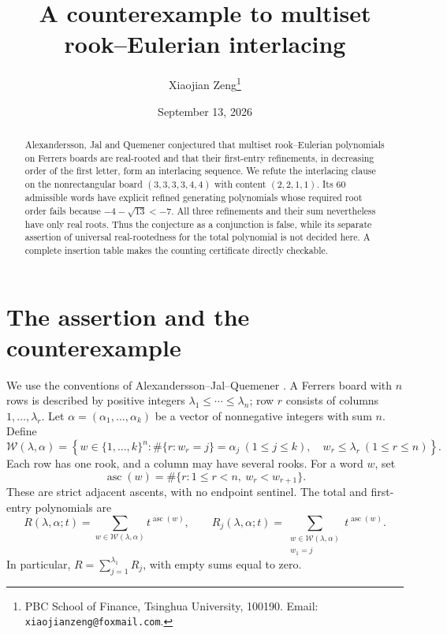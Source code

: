 \documentclass[11pt]{article}
\title{A counterexample to multiset rook--Eulerian interlacing}
\author{Xiaojian Zeng\thanks{PBC School of Finance, Tsinghua University,
100190. Email: \texttt{xiaojianzeng@foxmail.com}.}}
\date{September 13, 2026}
\DeclareMathOperator{\asc}{asc}
\newcommand{\W}{\mathcal W}
\begin{document}
\maketitle

\begin{abstract}
Alexandersson, Jal and Quemener conjectured that multiset rook--Eulerian
polynomials on Ferrers boards are real-rooted and that their first-entry
refinements, in decreasing order of the first letter, form an interlacing
sequence. We refute the interlacing clause on the nonrectangular board
$(3,3,3,3,4,4)$ with content $(2,2,1,1)$. Its $60$ admissible words have
explicit refined generating polynomials whose required root order fails
because $-4-\sqrt{13}<-7$. All three refinements and their sum nevertheless
have only real roots. Thus the conjecture as a conjunction is false, while
its separate assertion of universal real-rootedness for the total polynomial
is not decided here. A complete insertion table makes the counting
certificate directly checkable.
\end{abstract}

\section{The assertion and the counterexample}

We use the conventions of Alexandersson--Jal--Quemener
\cite[Definitions 5, 8 and 9; Section 3.3]{AJQ2025}.
A Ferrers board with $n$ rows is described by positive integers
$\lambda_1\leq\cdots\leq\lambda_n$; row $r$ consists of columns
$1,\ldots,\lambda_r$. Let $\alpha=(\alpha_1,\ldots,\alpha_k)$ be a
vector of nonnegative integers with sum $n$. Define
\[
 \W(\lambda,\alpha)=\left\{
 w\in\{1,\ldots,k\}^n:
 \#\{r:w_r=j\}=\alpha_j\ (1\leq j\leq k),\quad
 w_r\leq\lambda_r\ (1\leq r\leq n)
 \right\}.
\]
Each row has one rook, and a column may have several rooks.
For a word $w$, set
\[
 \asc(w)=\#\{r:1\leq r<n,\ w_r<w_{r+1}\}.
\]
These are strict adjacent ascents, with no endpoint sentinel. The total
and first-entry polynomials are
\begin{equation}\label{eq:definitions}
 R(\lambda,\alpha;t)=\sum_{w\in\W(\lambda,\alpha)}t^{\asc(w)},
 \qquad
 R_j(\lambda,\alpha;t)=
 \sum_{\substack{w\in\W(\lambda,\alpha)\\w_1=j}}t^{\asc(w)}.
\end{equation}
In particular, $R=\sum_{j=1}^{\lambda_1}R_j$, with empty sums equal to zero.
\end{document}
